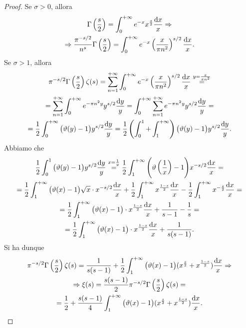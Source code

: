 \begin{proof}
  Se $\sigma>0$, allora
  \begin{gather*}
    \Gamma\left(\frac{s}{2}\right)=\int_0^{+\infty} e^{-x}x^{\frac{s}{2}}\frac{\mathop{}\!\mathrm{d} x}{x} \Rightarrow \\
    \Rightarrow \frac{\pi^{-s/2}}{n^s}\Gamma\left(\frac{s}{2}\right)=\int_0^{+\infty} e^{-x}\left(\frac{x}{\pi n^2}\right)^{s/2}\frac{\mathop{}\!\mathrm{d} x}{x}.
  \end{gather*}
  Se $\sigma>1$, allora
  \begin{gather*}
    \pi^{-s/2}\Gamma\left(\frac{s}{2}\right)\zeta(s)=\sum_{n=1}^{+\infty} \int_0^{+\infty} e^{-x}\left(\frac{x}{\pi n^2}\right)^{s/2}\frac{\mathop{}\!\mathrm{d} x}{x} \overset{y=\frac{x}{\pi n^2}}{=} \\
    =\sum_{n=1}^{+\infty} \int_0^{+\infty} e^{-\pi n^2 y}y^{s/2}\frac{\mathop{}\!\mathrm{d} y}{y}=\int_0^{+\infty} \sum_{n=1}^{+\infty} e^{-\pi n^2y}y^{s/2}\frac{\mathop{}\!\mathrm{d} y}{y}= \\
    =\frac{1}{2}\int_0^{+\infty} \big(\vartheta(y)-1\big)y^{s/2}\frac{\mathop{}\!\mathrm{d} y}{y}=\frac{1}{2}\left(\int_0^1+\int_1^{+\infty}\right)\big(\vartheta(y)-1\big)y^{s/2}\frac{\mathop{}\!\mathrm{d} y}{y}.
  \end{gather*}
  Abbiamo che
  \begin{gather*}
    \frac{1}{2} \int_0^1 \big(\vartheta(y)-1\big)y^{s/2}\frac{\mathop{}\!\mathrm{d} y}{y} \overset{x=\frac{1}{y}}{=} \frac{1}{2}\int_1^{+\infty} \Bigg(\vartheta\left(\frac{1}{x}\right)-1\Bigg)x^{-s/2}\frac{\mathop{}\!\mathrm{d} x}{x}= \\
    =\frac{1}{2}\int_1^{+\infty} \big(\vartheta(x)-1\big)\sqrt{x}\cdot x^{-s/2}\frac{\mathop{}\!\mathrm{d} x}{x}+\frac{1}{2}\int_1^{+\infty} x^{\frac{1-s}{2}}\frac{\mathop{}\!\mathrm{d} x}{x}-\frac{1}{2}\int_1^{+\infty} x^{-\frac{s}{2}}\frac{\mathop{}\!\mathrm{d} x}{x}= \\
    =\frac{1}{2}\int_1^{+\infty} \big(\vartheta(x)-1\big)\cdot x^{\frac{1-s}{2}}\frac{\mathop{}\!\mathrm{d} x}{x}+\frac{1}{s-1}-\frac{1}{s}=\\
    =\frac{1}{2}\int_1^{+\infty} \big(\vartheta(x)-1\big)\cdot x^{\frac{1-s}{2}}\frac{\mathop{}\!\mathrm{d} x}{x}+\frac{1}{s(s-1)}.
  \end{gather*}
  Si ha dunque
  \begin{gather*}
    \pi^{-s/2}\Gamma\left(\frac{s}{2}\right)\zeta(s)=\frac{1}{s(s-1)}+\frac{1}{2}\int_1^{+\infty} \big(\vartheta(x)-1\big)(x^{\frac{s}{2}}+x^{\frac{1-s}{2}})\frac{\diff x}{x} \implies \\
    \implies \xi(s)=\frac{s(s-1)}{2}\pi^{-s/2}\Gamma\left(\frac{s}{2}\right)\zeta(s)=\\
    =\frac{1}{2}+\frac{s(s-1)}{4}\int_1^{+\infty} \big(\vartheta(x)-1\big)(x^{\frac{s}{2}}+x^{\frac{1-s}{2}})\frac{\diff x}{x}.

\end{gather*}
\end{proof}
